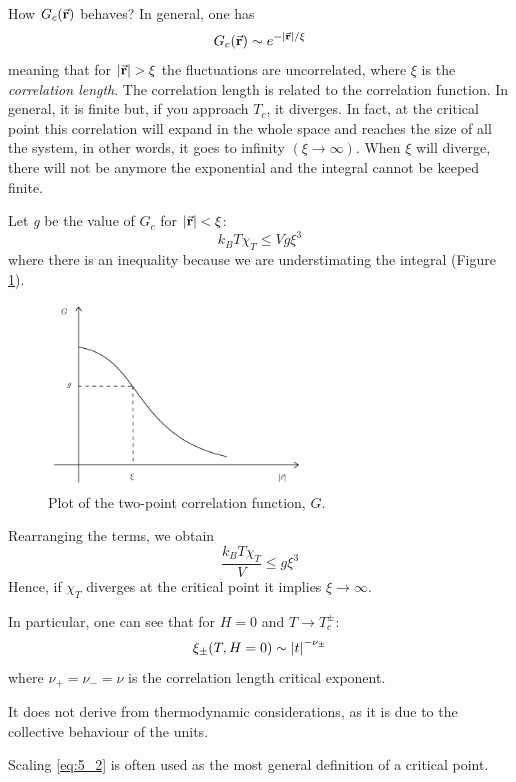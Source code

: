 \documentclass[../main/main.tex]{subfiles}
\begin{document}
How \( G_c (\va{r}) \) behaves? In general, one has
\begin{equation}
  G_c (\va{r}) \sim e^{- \abs{\va{r}}/\xi  }
\end{equation}
meaning that for \( \abs{\va{r}} > \xi   \) the fluctuations are uncorrelated, where \( \xi  \) is the \emph{correlation length}.
The correlation length is related to the correlation function. In general, it is finite but, if you approach \( T_c \), it diverges. In fact, at the critical point this correlation will expand in the whole space and reaches the size of all the system, in other words, it goes to infinity \( (\xi \rightarrow \infty ) \). When \( \xi  \)  will diverge, there will not be anymore the exponential and the integral cannot be keeped finite.


Let \emph{g} be the value of \( G_c \) for \( \abs{\va{r}} < \xi \):
\begin{equation*}
  k_B T \chi _T \le V g \xi ^3
\end{equation*}
where there is an inequality because we are understimating the integral (Figure \ref{fig:5_1}).

\begin{figure}[h!]
\centering
\includegraphics[width=0.6\textwidth]{../lessons/5_image/1.pdf}
\caption{\label{fig:5_1} Plot of the  two-point correlation function, \( G \).}
\end{figure}

\noindent Rearranging the terms, we obtain
\begin{equation}
  \frac{k_B T \chi _T}{V} \leq g \xi ^3
\end{equation}
Hence, if \( \chi _T \) diverges at the critical point it implies \( \xi \rightarrow \infty  \).

In particular, one can see that for \( H=0 \) and \( T \rightarrow T_c^\pm \):
\begin{equation}
  \xi _\pm (T,H=0) \sim \abs{t}^{- \nu _\pm}
  \label{eq:5_2}
\end{equation}
where \( \nu _+ = \nu _- = \nu  \) is the correlation length critical exponent.
\begin{remark}
It does not derive from thermodynamic considerations, as it is due to the collective behaviour of the units.
\end{remark}
\noindent Scaling \eqref{eq:5_2} is often used as the most general definition of a critical point. 
\end{document}
